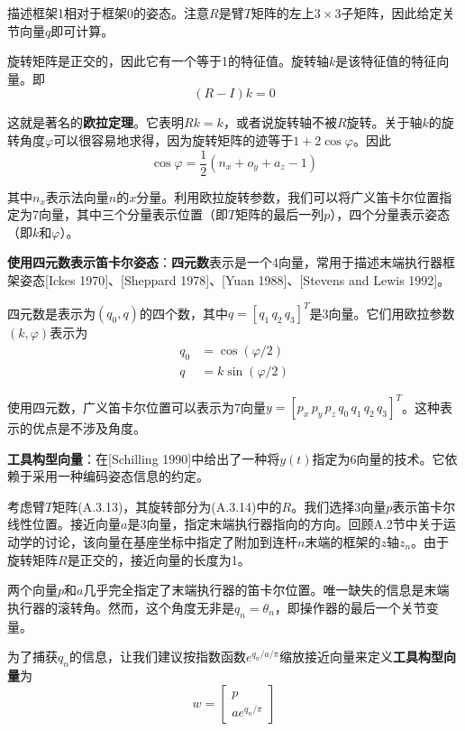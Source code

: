\documentclass[UTF8,a4paper]{ctexart}
\begin{document}
描述框架1相对于框架0的姿态。注意$R$是臂$T$矩阵的左上$3\times 3$子矩阵，因此给定关节向量$q$即可计算。

旋转矩阵是正交的，因此它有一个等于1的特征值。旋转轴$k$是该特征值的特征向量。即
\begin{equation}
(R - I)k = 0
\tag{A.3.15}
\end{equation}

这就是著名的\textbf{欧拉定理}。它表明$Rk = k$，或者说旋转轴不被$R$旋转。关于轴$k$的旋转角度$\varphi$可以很容易地求得，因为旋转矩阵的迹等于$1 + 2\cos\varphi$。因此
\begin{equation}
\cos\varphi = \frac{1}{2}(n_x + o_y + a_z - 1)
\tag{A.3.16}
\end{equation}

其中$n_x$表示法向量$n$的$x$分量。利用欧拉旋转参数，我们可以将广义笛卡尔位置指定为7向量，其中三个分量表示位置（即$T$矩阵的最后一列$p$），四个分量表示姿态（即$k$和$\varphi$）。

\textbf{使用四元数表示笛卡尔姿态}：\textbf{四元数}表示是一个4向量，常用于描述末端执行器框架姿态[Ickes 1970]、[Sheppard 1978]、[Yuan 1988]、[Stevens and Lewis 1992]。

四元数是表示为$(q_0, q)$的四个数，其中$q = [q_1 \, q_2 \, q_3]^T$是3向量。它们用欧拉参数$(k, \varphi)$表示为
\begin{equation}
\begin{aligned}
q_0 &= \cos(\varphi/2) \\
q &= k\sin(\varphi/2)
\end{aligned}
\tag{A.3.17}
\end{equation}

使用四元数，广义笛卡尔位置可以表示为7向量$y = [p_x \, p_y \, p_z \, q_0 \, q_1 \, q_2 \, q_3]^T$。这种表示的优点是不涉及角度。

\textbf{工具构型向量}：在[Schilling 1990]中给出了一种将$y(t)$指定为6向量的技术。它依赖于采用一种编码姿态信息的约定。

考虑臂$T$矩阵(A.3.13)，其旋转部分为(A.3.14)中的$R$。我们选择3向量$p$表示笛卡尔线性位置。接近向量$a$是3向量，指定末端执行器指向的方向。回顾A.2节中关于运动学的讨论，该向量在基座坐标中指定了附加到连杆$n$末端的框架的$z$轴$z_n$。由于旋转矩阵$R$是正交的，接近向量的长度为1。

两个向量$p$和$a$几乎完全指定了末端执行器的笛卡尔位置。唯一缺失的信息是末端执行器的滚转角。然而，这个角度无非是$q_n = \theta_n$，即操作器的最后一个关节变量。

为了捕获$q_n$的信息，让我们建议按指数函数$e^{q_n/a/\pi}$缩放接近向量来定义\textbf{工具构型向量}为
\begin{equation}
w = \begin{bmatrix} p \\ ae^{q_n/\pi} \end{bmatrix}
\tag{A.3.18}
\end{equation}
\end{document}

